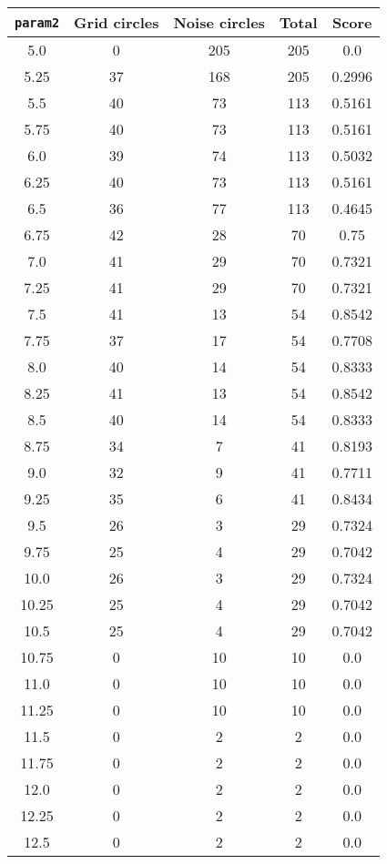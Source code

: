 \documentclass[letterpaper, 12pt]{article}
\begin{document}
\begin{longtable}{|c|c|c|c|c|}
\hline
\textbf{\texttt{param2}} & \textbf{Grid circles} & \textbf{Noise circles} & \textbf{Total} & \textbf{Score} \\
\hline
5.0 & 0 & 205 & 205 & 0.0 \\
\hline
5.25 & 37 & 168 & 205 & 0.2996 \\
\hline
5.5 & 40 & 73 & 113 & 0.5161 \\
\hline
5.75 & 40 & 73 & 113 & 0.5161 \\
\hline
6.0 & 39 & 74 & 113 & 0.5032 \\
\hline
6.25 & 40 & 73 & 113 & 0.5161 \\
\hline
6.5 & 36 & 77 & 113 & 0.4645 \\
\hline
6.75 & 42 & 28 & 70 & 0.75 \\
\hline
7.0 & 41 & 29 & 70 & 0.7321 \\
\hline
7.25 & 41 & 29 & 70 & 0.7321 \\
\hline
7.5 & 41 & 13 & 54 & 0.8542 \\
\hline
7.75 & 37 & 17 & 54 & 0.7708 \\
\hline
8.0 & 40 & 14 & 54 & 0.8333 \\
\hline
8.25 & 41 & 13 & 54 & 0.8542 \\
\hline
8.5 & 40 & 14 & 54 & 0.8333 \\
\hline
8.75 & 34 & 7 & 41 & 0.8193 \\
\hline
9.0 & 32 & 9 & 41 & 0.7711 \\
\hline
9.25 & 35 & 6 & 41 & 0.8434 \\
\hline
9.5 & 26 & 3 & 29 & 0.7324 \\
\hline
9.75 & 25 & 4 & 29 & 0.7042 \\
\hline
10.0 & 26 & 3 & 29 & 0.7324 \\
\hline
10.25 & 25 & 4 & 29 & 0.7042 \\
\hline
10.5 & 25 & 4 & 29 & 0.7042 \\
\hline
10.75 & 0 & 10 & 10 & 0.0 \\
\hline
11.0 & 0 & 10 & 10 & 0.0 \\
\hline
11.25 & 0 & 10 & 10 & 0.0 \\
\hline
11.5 & 0 & 2 & 2 & 0.0 \\
\hline
11.75 & 0 & 2 & 2 & 0.0 \\
\hline
12.0 & 0 & 2 & 2 & 0.0 \\
\hline
12.25 & 0 & 2 & 2 & 0.0 \\
\hline
12.5 & 0 & 2 & 2 & 0.0 \\

\end{longtable}
\end{document}
